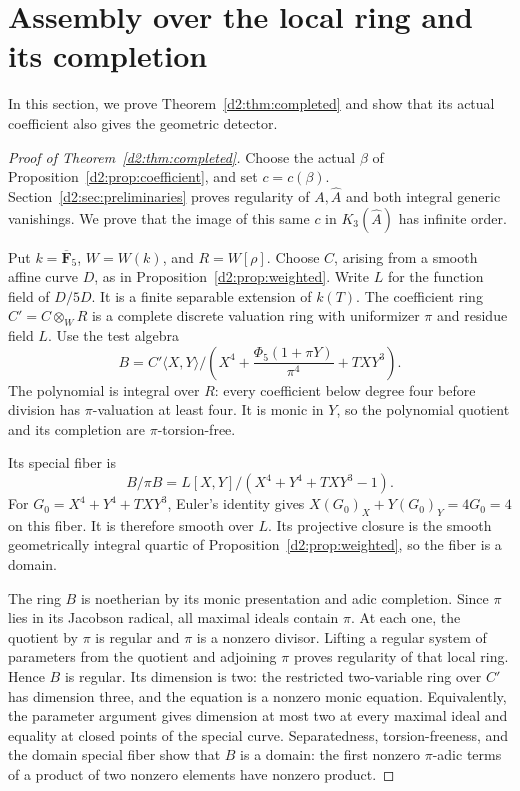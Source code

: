 \documentclass[11pt,a4paper]{amsart}
\numberwithin{equation}{section}
\theoremstyle{definition}
\theoremstyle{remark}
\newcommand{\DtwoFF}{\mathbf{F}}
\newcommand{\Dtwowh}{\widehat}
\begin{document}
\section{Assembly over the local ring and its completion}\label{d2:sec:assembly}

In this section, we prove Theorem~\ref{d2:thm:completed} and show that its
actual coefficient also gives the geometric detector.

\begin{proof}[Proof of Theorem~\ref{d2:thm:completed}]
Choose the actual \(\beta\) of Proposition~\ref{d2:prop:coefficient},
and set \(c=c(\beta)\).
Section~\ref{d2:sec:preliminaries} proves regularity of \(A,\Dtwowh A\)
and both integral generic vanishings.
We prove that the image of this same \(c\) in \(K_3(\Dtwowh A)\) has
infinite order.

Put \(k=\overline{\DtwoFF}_5\), \(W=W(k)\), and \(R=W[\rho]\).
Choose \(C\), arising from a smooth affine curve \(D\), as in
Proposition~\ref{d2:prop:weighted}.
Write \(L\) for the function field of \(D/5D\).
It is a finite separable extension of \(k(T)\).
The coefficient ring \(C'=C\otimes_WR\) is a complete discrete
valuation ring with uniformizer \(\pi\) and residue field \(L\).
Use the test algebra
\begin{equation}\label{d2:eq:test-algebra}
 B=C'\langle X,Y\rangle/
 \left(X^4+\frac{\Phi_5(1+\pi Y)}{\pi^4}+TXY^3\right).
\end{equation}
The polynomial is integral over \(R\): every coefficient below
degree four before division has \(\pi\)-valuation at least four.
It is monic in \(Y\), so the polynomial quotient and its completion
are \(\pi\)-torsion-free.

Its special fiber is
\begin{equation}\label{d2:eq:test-special}
 B/\pi B=L[X,Y]/(X^4+Y^4+TXY^3-1).
\end{equation}
For \(G_0=X^4+Y^4+TXY^3\), Euler's identity gives
\(X(G_0)_X+Y(G_0)_Y=4G_0=4\) on this fiber.
It is therefore smooth over \(L\).
Its projective closure is the smooth geometrically integral quartic
of Proposition~\ref{d2:prop:weighted}, so the fiber is a domain.

The ring \(B\) is noetherian by its monic presentation and adic
completion. Since \(\pi\) lies in its Jacobson radical, all maximal
ideals contain \(\pi\).
At each one, the quotient by \(\pi\) is regular and \(\pi\) is a
nonzero divisor. Lifting a regular system of parameters from the
quotient and adjoining \(\pi\) proves regularity of that local ring.
Hence \(B\) is regular.
Its dimension is two: the restricted two-variable ring over \(C'\)
has dimension three, and the equation is a nonzero monic equation.
Equivalently, the parameter argument gives dimension at most two
at every maximal ideal and equality at closed points of the special
curve.
Separatedness, torsion-freeness, and the domain special fiber show
that \(B\) is a domain: the first nonzero \(\pi\)-adic terms of a
product of two nonzero elements have nonzero product.


\end{proof}
\end{document}
